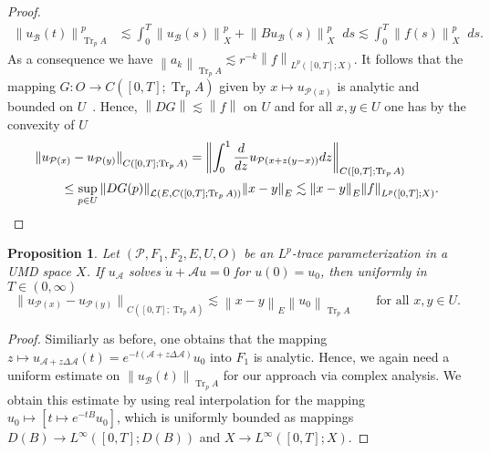 \documentclass[reqno,a4paper,final]{amsart}
\numberwithin{equation}{section}
\newtheorem{proposition}[lemma]{Proposition}
\theoremstyle{definition}
\begin{document}
\begin{proof}
		\begin{align*}
			{\left\lVert{u_{\mathcal{B}}(t)}\right\rVert}_{\operatorname{Tr}_p A}^p & \lesssim \int_0^T {\left\lVert{u_{\mathcal{B}}(s)}\right\rVert}_X^p + {\left\lVert{Bu_{\mathcal{B}}(s)}\right\rVert}_X^p {\mathop{}\!d} s \lesssim \int_0^T {\left\lVert{f(s)}\right\rVert}_X^p {\mathop{}\!d} s.
		\end{align*}
		As a consequence we have ${\left\lVert{a_k}\right\rVert}_{\operatorname{Tr}_p A} \lesssim r^{-k} {\left\lVert{f}\right\rVert}_{L^p([0,T];X)}$. It follows that the mapping $G\colon O \to C([0,T];\operatorname{Tr}_p A)$ given by $x \mapsto u_{\mathcal{P}(x)}$ is analytic and bounded on $U$~\cite[Proposition~3.7]{Din99}. Hence, ${\left\lVert{DG}\right\rVert} \lesssim {\left\lVert{f}\right\rVert}$ on $U$ and for all $x, y \in U$ one has by the convexity of $U$
		\begin{equation*}
			\begin{split}
				\MoveEqLeft {\lVert{u_{\mathcal{P}(x)} - u_{\mathcal{P}(y)}}\rVert}_{C([0,T];\operatorname{Tr}_p A)} = {\biggl\lVert{\int_0^1 \frac{d}{dz} u_{\mathcal{P}(x + z(y-x))} {\mathop{}\!d} z}\biggr\rVert}_{C([0,T];\operatorname{Tr}_p A)} \\
				& \le \sup_{p \in U} {\left\lVert{DG(p)}\right\rVert}_{\mathcal{L}(E,C([0,T];\operatorname{Tr}_p A))} {\left\lVert{x-y}\right\rVert}_E \lesssim {\left\lVert{x-y}\right\rVert}_E {\left\lVert{f}\right\rVert}_{L^p([0,T];X)}. \qedhere
			\end{split}
		\end{equation*}
	\end{proof}
	
	\begin{proposition}\label{prop:linfity_initial}
		Let $(\mathcal{P}, F_1 , F_2, E, U, O)$ be an $L^p$-trace parameterization in a UMD space $X$. If $u_{\mathcal{A}}$ solves $\dot{u} + \mathcal{A}u = 0$ for $u(0) = u_0$, then uniformly in $T \in (0, \infty)$
		\begin{equation*}
			{\lVert{u_{\mathcal{P}(x)} - u_{\mathcal{P}(y)}}\rVert}_{C([0,T];\operatorname{Tr}_p A)} \lesssim {\left\lVert{x-y}\right\rVert}_E {\left\lVert{u_0}\right\rVert}_{\operatorname{Tr}_p A} \qquad \text{for all } x,y \in U.
		\end{equation*}
	\end{proposition}
	\begin{proof}
		Similiarly as before, one obtains that the mapping $z \mapsto u_{\mathcal{A} + z \Delta \mathcal{A}}(t) = e^{-t(\mathcal{A} + z \Delta \mathcal{A})} u_0$ into $F_1$ is analytic. Hence, we again need a uniform estimate on ${\left\lVert{u_{\mathcal{B}}(t)}\right\rVert}_{\operatorname{Tr}_p A}$ for our approach via complex analysis. We obtain this estimate by using real interpolation for the mapping $u_0 \mapsto [t \mapsto e^{-tB} u_0]$, which is uniformly bounded as mappings $D(B) \to L^{\infty}([0,T]; D(B))$ and $X \to L^{\infty}([0,T];X)$.
	\end{proof}
\end{document}
